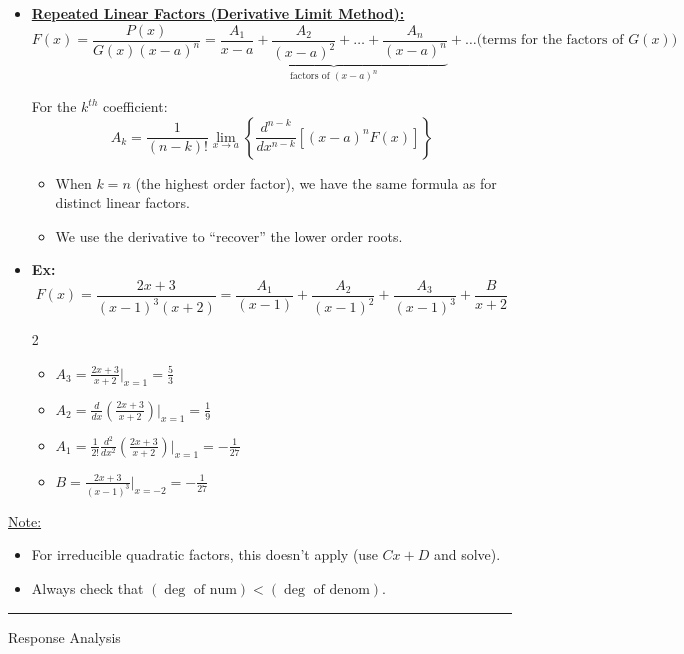 \documentclass[12pt]{article}
\begin{document}
\begin{itemize}
    \item \underline{\textbf{Repeated Linear Factors (Derivative Limit Method):}}
    \[ F(x) = \frac{P(x)}{G(x)(x-a)^n} = \underbrace{\frac{A_1}{x-a} + \frac{A_2}{(x-a)^2} + \dots + \frac{A_n}{(x-a)^n}}_{\text{factors of } (x-a)^n} + \dots \text{(terms for the factors of } G(x) ) \]

    For the $k^{th}$ coefficient:
    \[ A_k = \frac{1}{(n-k)!} \lim_{x \to a} \left\{ \frac{d^{n-k}}{dx^{n-k}} \left[ (x-a)^n F(x) \right]\right\} \]
    \begin{itemize}
        \item When $k=n$ (the highest order factor), we have the same formula as for distinct linear factors.
        \item We use the derivative to ``recover'' the lower order roots.
    \end{itemize}

    \item \textbf{Ex:}
    \[ F(x) = \frac{2x+3}{(x-1)^3(x+2)} = \frac{A_1}{(x-1)} + \frac{A_2}{(x-1)^2} + \frac{A_3}{(x-1)^3} + \frac{B}{x+2} \]
    \begin{multicols}{2}
        \begin{itemize}
        \item[] $A_3 = \frac{2x+3}{x+2} \Big|_{x=1} = \frac{5}{3}$
        \item[] $A_2 = \frac{d}{dx} \left( \frac{2x+3}{x+2} \right) \Big|_{x=1} = \frac{1}{9}$
        \item[] $A_1 = \frac{1}{2!} \frac{d^2}{dx^2} \left( \frac{2x+3}{x+2} \right) \Big|_{x=1} = -\frac{1}{27}$
        \item[] $B = \frac{2x+3}{(x-1)^3} \Big|_{x=-2} = -\frac{1}{27}$
        \end{itemize}
    \end{multicols}
\end{itemize}
\noindent\underline{Note:} 
\begin{itemize}
    \item For irreducible quadratic factors, this doesn't apply (use $Cx+D$ and solve).
    \item Always check that $(\deg \text{ of num}) < (\deg \text{ of denom})$.
\end{itemize}
\vspace{1em}
\noindent\hrule
\vspace{1em}
\newpage
\begin{center}
{\LARGE Response Analysis\par}
\end{center}
\end{document}

